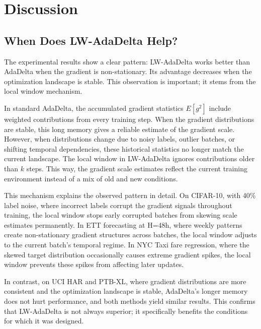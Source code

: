 \documentclass[11pt,a4paper]{article}
\begin{document}
\section{Discussion}
\label{sec:discussion}

\subsection{When Does LW-AdaDelta Help?}

The experimental results show a clear pattern: LW-AdaDelta works better than AdaDelta when the gradient is non-stationary. Its advantage decreases when the optimization landscape is stable. This observation is important; it stems from the local window mechanism.

In standard AdaDelta, the accumulated gradient statistics $E[g^2]$ include weighted contributions from every training step. When the gradient distributions are stable, this long memory gives a reliable estimate of the gradient scale. However, when distributions change due to noisy labels, outlier batches, or shifting temporal dependencies, these historical statistics no longer match the current landscape. The local window in LW-AdaDelta ignores contributions older than $k$ steps. This way, the gradient scale estimates reflect the current training environment instead of a mix of old and new conditions.

This mechanism explains the observed pattern in detail. On CIFAR-10, with 40\% label noise, where incorrect labels corrupt the gradient signals throughout training, the local window stops early corrupted batches from skewing scale estimates permanently. In ETT forecasting at H=48h, where weekly patterns create non-stationary gradient structures across batches, the local window adjusts to the current batch's temporal regime. In NYC Taxi fare regression, where the skewed target distribution occasionally causes extreme gradient spikes, the local window prevents these spikes from affecting later updates.

In contrast, on UCI HAR and PTB-XL, where gradient distributions are more consistent and the optimization landscape is stable, AdaDelta's longer memory does not hurt performance, and both methods yield similar results. This confirms that LW-AdaDelta is not always superior; it specifically benefits the conditions for which it was designed.
\end{document}
